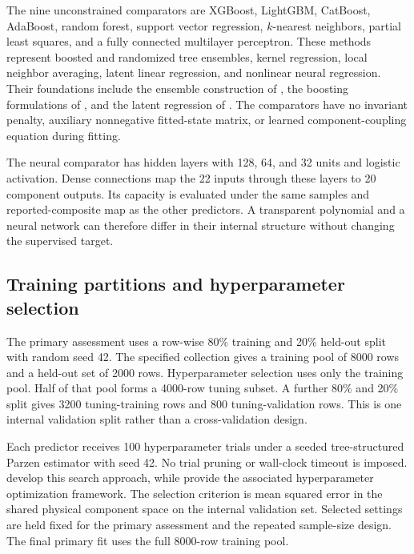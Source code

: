 The nine unconstrained comparators are XGBoost, LightGBM, CatBoost, AdaBoost, random forest, support vector regression, \(k\)-nearest neighbors, partial least squares, and a fully connected multilayer perceptron. These methods represent boosted and randomized tree ensembles, kernel regression, local neighbor averaging, latent linear regression, and nonlinear neural regression. Their foundations include the ensemble construction of \citet{Breiman2001}, the boosting formulations of \citet{Drucker1997,ChenGuestrin2016,Ke2017,Prokhorenkova2018}, and the latent regression of \citet{Wold2001}. The comparators have no invariant penalty, auxiliary nonnegative fitted-state matrix, or learned component-coupling equation during fitting.

The neural comparator has hidden layers with 128, 64, and 32 units and logistic activation. Dense connections map the 22 inputs through these layers to 20 component outputs. Its capacity is evaluated under the same samples and reported-composite map as the other predictors. A transparent polynomial and a neural network can therefore differ in their internal structure without changing the supervised target.

\subsection{Training partitions and hyperparameter selection}

The primary assessment uses a row-wise 80\% training and 20\% held-out split with random seed 42. The specified collection gives a training pool of 8000 rows and a held-out set of 2000 rows. Hyperparameter selection uses only the training pool. Half of that pool forms a 4000-row tuning subset. A further 80\% and 20\% split gives 3200 tuning-training rows and 800 tuning-validation rows. This is one internal validation split rather than a cross-validation design.

Each predictor receives 100 hyperparameter trials under a seeded tree-structured Parzen estimator with seed 42. No trial pruning or wall-clock timeout is imposed. \citet{Bergstra2011} develop this search approach, while \citet{Akiba2019} provide the associated hyperparameter optimization framework. The selection criterion is mean squared error in the shared physical component space on the internal validation set. Selected settings are held fixed for the primary assessment and the repeated sample-size design. The final primary fit uses the full 8000-row training pool.

